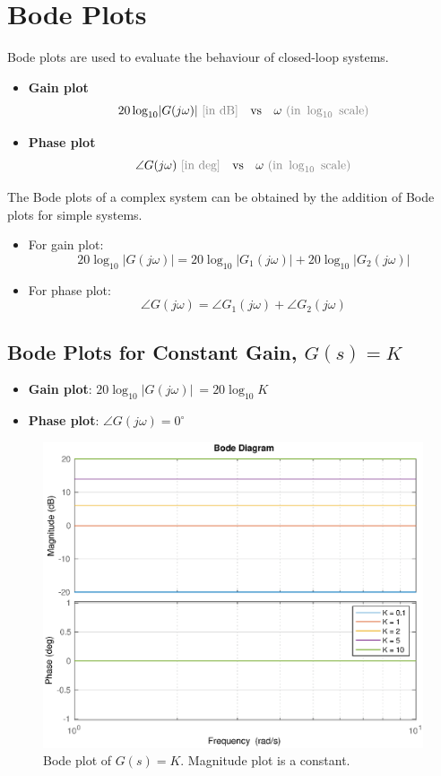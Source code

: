 \documentclass[12pt,a4paper]{article}
\begin{document}
\newpage
\section{Bode Plots}
Bode plots are used to evaluate the behaviour of closed-loop systems.
\begin{itemize}
\item \textbf{Gain plot} \[20\log_{10}\lvert G(j\omega) \rvert \ \text{\textcolor{gray}{[in dB]}}\quad \text{vs} \quad \omega \ \textcolor{gray}{(\text{in } \log_{10} \ \text{scale})}\]
\item \textbf{Phase plot} \[\angle G(j\omega) \ \text{\textcolor{gray}{[in deg]}} \quad \text{vs} \quad \omega \ \textcolor{gray}{(\text{in } \log_{10} \ \text{scale})}  \]
\end{itemize}
The Bode plots of a complex system can be obtained by the addition of Bode plots for simple systems.
\begin{itemize}
\item For gain plot:
\[20\log_{10}\lvert G(j\omega)\rvert  = 20\log_{10}\lvert G_{1}(j\omega)\rvert+20\log_{10}\lvert G_{2}(j\omega)\rvert \]
\item For phase plot:
\[\angle G(j\omega) = \angle G_{1}(j\omega)+\angle G_{2}(j\omega) \]
\end{itemize}

\subsection{Bode Plots for Constant Gain, $G(s) = K$}
\begin{itemize}
\item \textbf{Gain plot}: $20\log_{10}\lvert G(j\omega) \rvert \ = 20\log_{10}K$ 
\item \textbf{Phase plot}: $\angle G(j\omega) = 0^{\circ}$
\end{itemize}\vspace{-.9cm}
\begin{figure}[H] \centering 
\includegraphics[width=.7\textwidth]{images/bode_3.eps}
\caption{Bode plot of $G(s) = K$. Magnitude plot is a constant.}
\end{figure}
\end{document}
